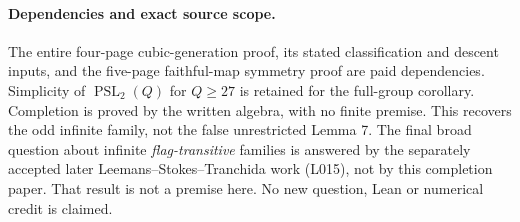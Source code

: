 \documentclass[11pt,a4paper]{article}
\newcommand{\PSL}{\operatorname{PSL}}
\begin{document}
\paragraph{Dependencies and exact source scope.}
The entire four-page cubic-generation proof, its stated classification
and descent inputs, and the five-page faithful-map symmetry proof are
paid dependencies. Simplicity of $\PSL_2(Q)$ for $Q\geq27$ is
retained for the full-group corollary. Completion is proved by the
written algebra, with no finite premise. This recovers the odd
infinite family, not the false unrestricted Lemma 7. The final broad
question about infinite \emph{flag-transitive} families is answered by
the separately accepted later Leemans--Stokes--Tranchida work (L015),
not by this completion paper. That result is not a premise here.
No new question, Lean or numerical credit is claimed.
\end{document}
